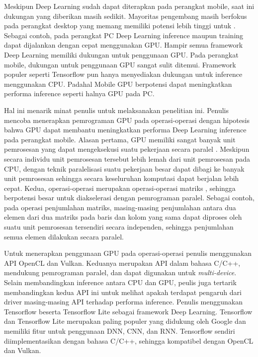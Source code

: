 Meskipun Deep Learning sudah dapat diterapkan pada perangkat mobile, saat ini dukungan yang diberikan masih sedikit. Mayoritas pengembang masih berfokus pada perangkat desktop yang memang memiliki potensi lebih tinggi untuk \deeplearning. Sebagai contoh, pada perangkat PC Deep Learning inference maupun training dapat dijalankan dengan cepat menggunakan GPU. Hampir semua framework Deep Learning memiliki dukungan untuk penggunaan GPU. Pada perangkat mobile, dukungan untuk penggunaan GPU sangat sulit ditemui. Framework populer seperti Tensorflow pun hanya menyediakan dukungan untuk inference menggunakan CPU. Padahal Mobile GPU berpotensi dapat meningkatkan performa inference seperti halnya GPU pada PC. 

Hal ini menarik minat penulis untuk melaksanakan penelitian ini. Penulis mencoba menerapkan pemrograman GPU pada operasi-operasi \deeplearning \inference dengan hipotesis bahwa GPU dapat membantu meningkatkan performa Deep Learning inference pada perangkat mobile. Alasan pertama, GPU memiliki sangat banyak unit pemrosesan yang dapat mengeksekusi suatu pekerjaan secara paralel \cite{cudagpgpu}. Meskipun secara individu unit pemrosesan tersebut lebih lemah dari unit pemrosesan pada CPU, dengan teknik paralelisasi suatu pekerjaan besar dapat dibagi ke banyak unit pemrosesan sehingga secara keseluruhan komputasi dapat berjalan lebih cepat. Kedua, operasi-operasi \deeplearning \inference merupakan operasi-operasi matriks \cite{deeplearningmatrix}, sehingga berpotensi besar untuk diakselerasi dengan pemrograman paralel. Sebagai contoh, pada operasi penjumlahan matriks, masing-masing penjumlahan antara dua elemen dari dua matriks pada baris dan kolom yang sama dapat diproses oleh suatu unit pemrosesan tersendiri secara independen, sehingga penjumlahan semua elemen dilakukan secara paralel.

Untuk menerapkan penggunaan GPU pada operasi-operasi \deeplearning \inference penulis menggunakan API OpenCL dan Vulkan. Keduanya merupakan API dalam bahasa C/C++, mendukung pemrograman paralel, dan dapat digunakan untuk \textit{multi-device}. Selain membandingkan inference antara CPU dan GPU, peulis juga tertarik membandingkan kedua API ini untuk melihat apakah terdapat pengaruh dari driver masing-masing API terhadap performa inference. Penulis menggunakan Tensorflow beserta Tensorflow Lite sebagai framework Deep Learning. Tensorflow dan Tensorflow Lite merupakan \framework \deeplearning paling populer yang didukung oleh Google dan memiliki fitur untuk penggunaan DNN, CNN, dan RNN. Tensorflow sendiri diimplementasikan dengan bahasa C/C++, sehingga kompatibel dengan OpenCL dan Vulkan.

